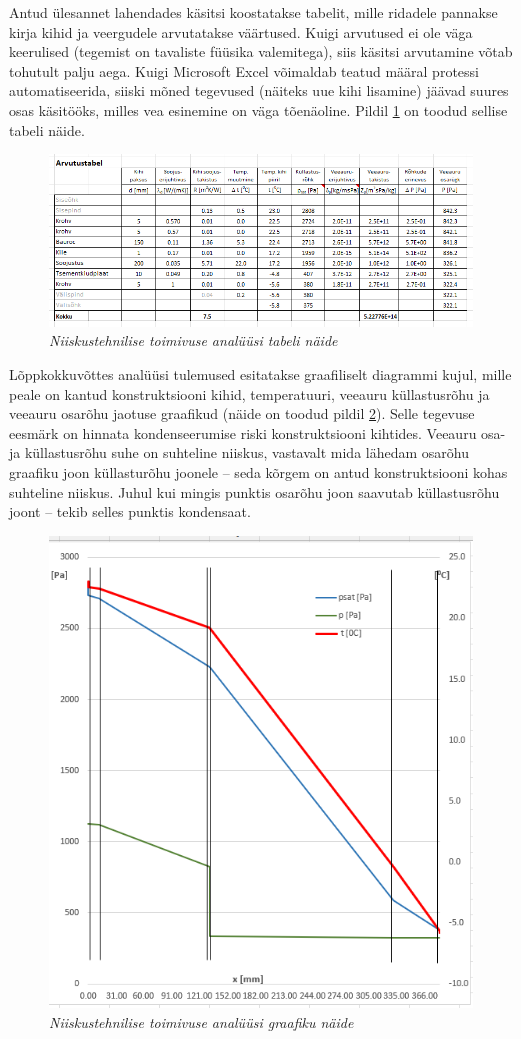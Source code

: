 Antud ülesannet lahendades käsitsi koostatakse tabelit, mille ridadele pannakse kirja kihid ja veergudele arvutatakse 
väärtused. Kuigi arvutused ei ole väga keerulised (tegemist on tavaliste füüsika valemitega), siis käsitsi arvutamine 
võtab tohutult palju aega. Kuigi Microsoft Excel võimaldab teatud määral protessi automatiseerida, siiski mõned 
tegevused (näiteks uue kihi lisamine) jäävad suures osas käsitööks, milles vea esinemine on väga tõenäoline. Pildil 
\ref{fig:excel_table_sample} on toodud sellise tabeli näide.
\begin{figure}[ht]
    \centering
    \includegraphics[width=.8\textwidth]{figures/01_analogues/04_calc_table.png}
    \caption{\textit{Niiskustehnilise toimivuse analüüsi tabeli näide}}
    \label{fig:excel_table_sample}
\end{figure}

Lõppkokkuvõttes analüüsi tulemused esitatakse graafiliselt diagrammi kujul, mille peale on kantud konstruktsiooni 
kihid, temperatuuri, veeauru küllastusrõhu ja veeauru osarõhu jaotuse graafikud (näide on toodud pildil \ref{fig:excel_graph_sample}). 
Selle tegevuse eesmärk on hinnata kondenseerumise riski konstruktsiooni kihtides. Veeauru osa- ja küllastusrõhu 
suhe on suhteline niiskus, vastavalt mida lähedam osarõhu graafiku joon küllasturõhu joonele -- seda kõrgem on 
antud konstruktsiooni kohas suhteline niiskus. Juhul kui mingis punktis osarõhu joon saavutab küllastusrõhu 
joont -- tekib selles punktis kondensaat. 

\begin{figure}[ht]
    \centering
    \includegraphics[width=.6\textwidth]{figures/01_analogues/05_excel_grafic_sample.png}
    \caption{\textit{Niiskustehnilise toimivuse analüüsi graafiku näide}}
    \label{fig:excel_graph_sample}
\end{figure}




